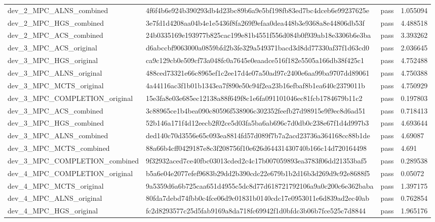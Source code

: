 \begin{tabular}{llll}
dev\_2\_MPC\_ALNS\_combined & 4f6f4b6e924b390293db4d23bc89b6a9e5bf198fb83ed7bc4dceb6e99237625e & pass & 1.055094 \\
dev\_2\_MPC\_HGS\_combined & 3e7fd1d4208aa04b4e1e5436f8fa269f9efaa0dea448b3e9368a8e44806db53f & pass & 4.488518 \\
dev\_2\_MPC\_ACS\_combined & 24b0335169e193977b825cac199e81b4551f556d084b0f939ab18e3306b6e3ba & pass & 3.393262 \\
dev\_3\_MPC\_ACS\_original & d6abccbf9063000a0859bfd2b3fe329a549371bacd3d8dd77330af37f1d63cd0 & pass & 2.036645 \\
dev\_3\_MPC\_HGS\_original & ca9c129cb0e509cf73a048fc0a7645e0eaadce516f182e5505a166db38f425c1 & pass & 4.752488 \\
dev\_3\_MPC\_ALNS\_original & 488ced73321e66c8965ef1c2ee17d4e07a50ad97c2400e6aa99ba9707dd89061 & pass & 4.750388 \\
dev\_3\_MPC\_MCTS\_original & 4a44116ac3f1b01b1343ea7f890e50c94f2ea23b16efbaf8b1ea640c2379011b & pass & 4.750929 \\
dev\_3\_MPC\_COMPLETION\_original & 15e3fa8e03e685ec12138a88f649f8c1e6fa091101046ec81fcb1784679b11c2 & pass & 0.197803 \\
dev\_3\_MPC\_ACS\_combined & 3c88965ce1b4bea090c80596f538906c302352feefb27d98915e9f9ec8d6ad51 & pass & 0.718413 \\
dev\_3\_MPC\_HGS\_combined & 52b146a171f4d12eecb2f02ce5d03fa5ba6ab696c7d0db0c238e67f1d4d997b3 & pass & 4.693644 \\
dev\_3\_MPC\_ALNS\_combined & ded140c70d3556e65c093ea8814fd57d089f7b7a2acd23736a364168cc88b1de & pass & 4.69087 \\
dev\_3\_MPC\_MCTS\_combined & 88a66b4cff0429187e8c3f208756f10e626d64431430740b166c14d720164498 & pass & 4.691 \\
dev\_3\_MPC\_COMPLETION\_combined & 9f32932aced7ce40fbc03013cded2c4c17b007059893ea3783f06dd21353baf5 & pass & 0.289538 \\
dev\_4\_MPC\_COMPLETION\_original & b5a6e04e2077efef9683b29dd2b390cdc22e679b1b2d16b3d269d9c92e8688f5 & pass & 0.05072 \\
dev\_4\_MPC\_MCTS\_original & 9a5359d6a6b725caa651d4955c5dc8d77d618721792106a9a0c200c6e362baba & pass & 1.397175 \\
dev\_4\_MPC\_ALNS\_original & 80fda7debd74fbb0c4fce06d9c01831b0140cdc17e0953011e6d839ad2ec40ab & pass & 0.762854 \\
dev\_4\_MPC\_HGS\_original & fc2d8293577c25d5fab9169a8da718fc69942f1d0bfdc3b06b7fce525c7d8844 & pass & 1.965176 \\

\end{tabular}
